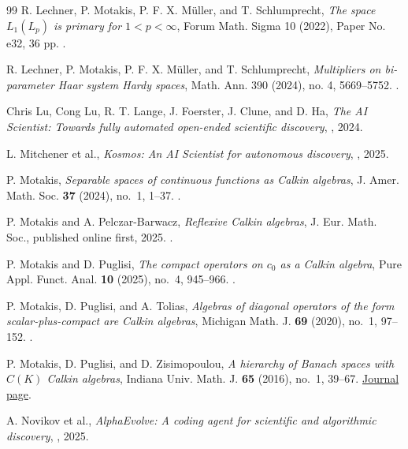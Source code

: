 \documentclass[11pt,reqno]{amsart}
\theoremstyle{plain}
\theoremstyle{definition}
\begin{document}
\begin{thebibliography}{99}
R. Lechner, P. Motakis, P. F. X. M\"uller, and T. Schlumprecht,
\newblock \emph{The space $L_1(L_p)$ is primary for $1<p<\infty$},
\newblock Forum Math. Sigma 10 (2022), Paper No. e32, 36 pp.
\newblock {}.

R. Lechner, P. Motakis, P. F. X. M\"uller, and T. Schlumprecht,
\newblock \emph{Multipliers on bi-parameter Haar system Hardy spaces},
\newblock Math. Ann. 390 (2024), no. 4, 5669--5752.
\newblock {}.

Chris Lu, Cong Lu, R. T. Lange, J. Foerster, J. Clune, and D. Ha,
\newblock \emph{The AI Scientist: Towards fully automated open-ended scientific discovery},
\newblock {}, 2024.

L. Mitchener et al.,
\newblock \emph{Kosmos: An AI Scientist for autonomous discovery},
\newblock {}, 2025.

P. Motakis,
\newblock \emph{Separable spaces of continuous functions as Calkin algebras},
\newblock J. Amer. Math. Soc. \textbf{37} (2024), no.~1, 1--37.
\newblock {}.

P. Motakis and A. Pelczar-Barwacz,
\newblock \emph{Reflexive Calkin algebras},
\newblock J. Eur. Math. Soc., published online first, 2025.
\newblock {}.

P. Motakis and D. Puglisi,
\newblock \emph{The compact operators on $c_0$ as a Calkin algebra},
\newblock Pure Appl. Funct. Anal. \textbf{10} (2025), no.~4, 945--966.
\newblock {}.

P. Motakis, D. Puglisi, and A. Tolias,
\newblock \emph{Algebras of diagonal operators of the form
scalar-plus-compact are Calkin algebras},
\newblock Michigan Math. J. \textbf{69} (2020), no.~1, 97--152.
\newblock {}.

P. Motakis, D. Puglisi, and D. Zisimopoulou,
\newblock \emph{A hierarchy of Banach spaces with $C(K)$ Calkin algebras},
\newblock Indiana Univ. Math. J. \textbf{65} (2016), no.~1, 39--67.
\newblock \href{https://iumj.org/article/6688/}{Journal page}.

A. Novikov et al.,
\newblock \emph{AlphaEvolve: A coding agent for scientific and algorithmic discovery},
\newblock {}, 2025.


\end{thebibliography}
\end{document}
